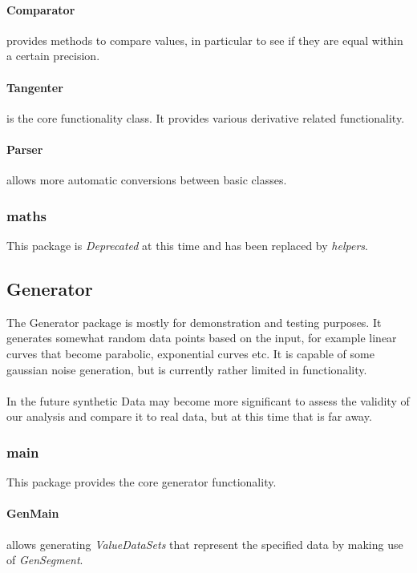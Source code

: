 \documentclass{article}
\begin{document}
  \paragraph{Comparator}  provides methods to compare values, in particular to see if they are equal within a certain precision.
  
  \paragraph{Tangenter} is the core functionality class. It provides various derivative related functionality.
  
  \paragraph{Parser} allows more automatic conversions between basic classes.
  
  \subsubsection*{maths}
  
  This package is \textit{Deprecated} at this time and has been replaced by \textit{helpers}.
  
  \subsection{Generator}
  
  The Generator package is mostly for demonstration and testing purposes. It generates somewhat random data points based on the input, for example linear curves that become parabolic, exponential curves etc. It is capable of some gaussian noise generation, but is currently rather limited in functionality.
  \\\\
  In the future synthetic Data may become more significant to assess the validity of our analysis and compare it to real data, but at this time that is far away.
  
  \subsubsection*{main}
  
  This package provides the core generator functionality.
  
  \paragraph{GenMain} allows generating \textit{ValueDataSets} that represent the specified data by making use of \textit{GenSegment}.
  
\end{document}

